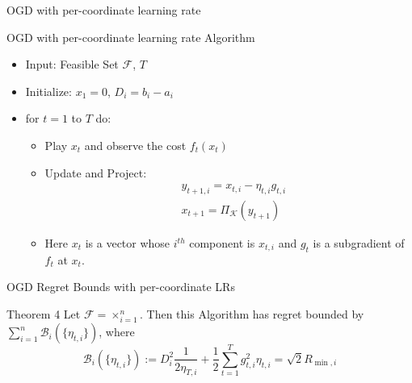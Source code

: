 \documentclass[
	11pt, %
]{beamer}
\begin{document}
\begin{frame}{OGD with per-coordinate learning rate}
    \begin{block}{OGD with per-coordinate learning rate Algorithm}
        \begin{itemize}
            \item Input: Feasible Set $\mathcal{F}$, $T$
            \item Initialize: $x_1 = 0$, $D_i = b_i - a_i$
            \item for $t = 1$ to $T$ do:
            \begin{itemize}
                \item Play $x_t$ and observe the cost $f_t(x_t)$
                \item Update and Project:
                $$
                \begin{aligned}
                    & y_{t+1, i} = x_{t,i} - \eta_{t,i} g_{t,i} \\
                    & x_{t+1} = \Pi_{\mathcal{K}} (y_{t+1})
                \end{aligned}
                $$
                \item Here $x_t$ is a vector whose $i^{th}$ component is $x_{t,i}$ and $g_t$ is a subgradient of $f_t$ at $x_t$.
            \end{itemize}
        \end{itemize}
    \end{block}
\end{frame}

\begin{frame}{OGD Regret Bounds with per-coordinate LRs}
    \begin{block}{Theorem 4}
        Let $\mathcal{F} = \times_{i = 1}^{n}$. Then this Algorithm has regret bounded by $\sum_{i=1}^{n} \mathcal{B}_i \left({\{\eta_{t,i}\}}\right)$, where
        $$
        \mathcal{B}_i \left({\{\eta_{t,i}\}}\right) := D_i^2 \frac{1}{2 \eta_{T,i}} + \frac{1}{2} \sum_{t=1}^{T} g_{t,i}^2 \eta_{t,i} = \sqrt{2}R_{\min,i}
        $$
    \end{block}
\end{frame}
\end{document}
